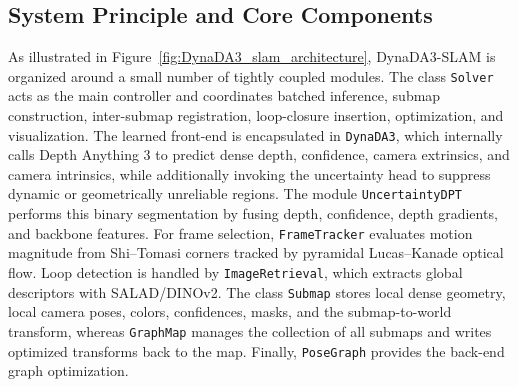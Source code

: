 \subsection{System Principle and Core Components}
As illustrated in Figure~\ref{fig:DynaDA3_slam_architecture}, DynaDA3-SLAM is organized around a small number of tightly coupled modules. The class \texttt{Solver} acts as the main controller and coordinates batched inference, submap construction, inter-submap registration, loop-closure insertion, optimization, and visualization. The learned front-end is encapsulated in \texttt{DynaDA3}, which internally calls Depth Anything 3 to predict dense depth, confidence, camera extrinsics, and camera intrinsics, while additionally invoking the uncertainty head to suppress dynamic or geometrically unreliable regions. The module \texttt{UncertaintyDPT} performs this binary segmentation by fusing depth, confidence, depth gradients, and backbone features. For frame selection, \texttt{FrameTracker} evaluates motion magnitude from Shi--Tomasi corners tracked by pyramidal Lucas--Kanade optical flow. Loop detection is handled by \texttt{ImageRetrieval}, which extracts global descriptors with SALAD/DINOv2. The class \texttt{Submap} stores local dense geometry, local camera poses, colors, confidences, masks, and the submap-to-world transform, whereas \texttt{GraphMap} manages the collection of all submaps and writes optimized transforms back to the map. Finally, \texttt{PoseGraph} provides the back-end graph optimization.


